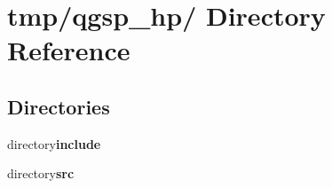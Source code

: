 \section{tmp/qgsp\_\-hp/ Directory Reference}
\label{dir_000003}
\subsection*{Directories}
\begin{CompactItemize}
\item 
directory{\bf include}
\item 
directory{\bf src}
\end{CompactItemize}
